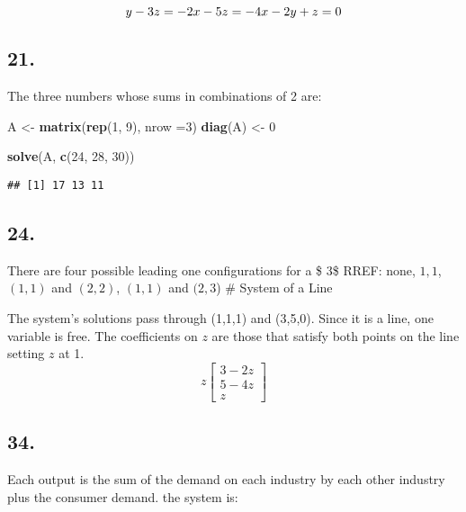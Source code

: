 \documentclass[]{article}
\newenvironment{Shaded}{\begin{snugshade}}{\end{snugshade}}
\newcommand{\DataTypeTok}[1]{\textcolor[rgb]{0.13,0.29,0.53}{#1}}
\newcommand{\DecValTok}[1]{\textcolor[rgb]{0.00,0.00,0.81}{#1}}
\newcommand{\KeywordTok}[1]{\textcolor[rgb]{0.13,0.29,0.53}{\textbf{#1}}}
\newcommand{\NormalTok}[1]{#1}
\newcommand{\StringTok}[1]{\textcolor[rgb]{0.31,0.60,0.02}{#1}}
\begin{document}
\[y-3z=-2\\
x-5z=-4\\
x-2y+z=0\]

\hypertarget{section-1}{%
\subsection{21.}\label{section-1}}

The three numbers whose sums in combinations of 2 are:

\begin{Shaded}
\begin{Highlighting}[]
\NormalTok{A <-}\StringTok{ }\KeywordTok{matrix}\NormalTok{(}\KeywordTok{rep}\NormalTok{(}\DecValTok{1}\NormalTok{, }\DecValTok{9}\NormalTok{), }\DataTypeTok{nrow =}\DecValTok{3}\NormalTok{)}
\KeywordTok{diag}\NormalTok{(A) <-}\StringTok{ }\DecValTok{0}

\KeywordTok{solve}\NormalTok{(A, }\KeywordTok{c}\NormalTok{(}\DecValTok{24}\NormalTok{, }\DecValTok{28}\NormalTok{, }\DecValTok{30}\NormalTok{))}
\end{Highlighting}
\end{Shaded}

\begin{verbatim}
## [1] 17 13 11
\end{verbatim}

\hypertarget{section-2}{%
\subsection{24.}\label{section-2}}

There are four possible leading one configurations for a \$ 3\$
RREF: none, \(1, 1\), \((1, 1)\) and \((2, 2)\), \((1, 1)\) and
\((2, 3\)) \# System of a Line

The system's solutions pass through (1,1,1) and (3,5,0). Since it is a
line, one variable is free. The coefficients on \(z\) are those that
satisfy both points on the line setting \(z\) at 1.
\[z\begin{bmatrix}3-2z\\5-4z\\z\end{bmatrix}\]

\hypertarget{section-3}{%
\subsection{34.}\label{section-3}}

Each output is the sum of the demand on each industry by each other
industry plus the consumer demand. the system is:
\end{document}
